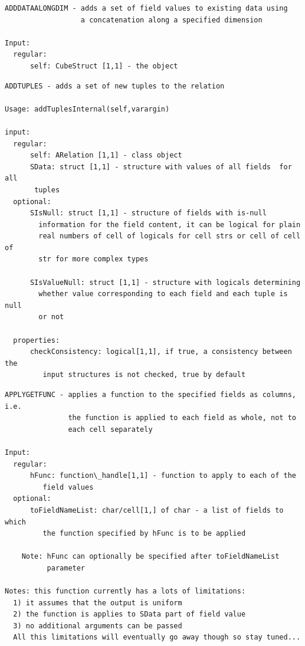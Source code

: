 \documentclass[letterpaper,10pt,english]{sphinxmanual}
\begin{document}
\begin{Verbatim}[commandchars=\\\{\}]
ADDDATAALONGDIM - adds a set of field values to existing data using
                  a concatenation along a specified dimension

Input:
  regular:
      self: CubeStruct [1,1] - the object
\end{Verbatim}

\begin{Verbatim}[commandchars=\\\{\}]
ADDTUPLES - adds a set of new tuples to the relation

Usage: addTuplesInternal(self,varargin)

input:
  regular:
      self: ARelation [1,1] - class object
      SData: struct [1,1] - structure with values of all fields  for all
       tuples
  optional:
      SIsNull: struct [1,1] - structure of fields with is-null
        information for the field content, it can be logical for plain
        real numbers of cell of logicals for cell strs or cell of cell of
        str for more complex types

      SIsValueNull: struct [1,1] - structure with logicals determining
        whether value corresponding to each field and each tuple is null
        or not

  properties:
      checkConsistency: logical[1,1], if true, a consistency between the
         input structures is not checked, true by default
\end{Verbatim}

\begin{Verbatim}[commandchars=\\\{\}]
APPLYGETFUNC - applies a function to the specified fields as columns, i.e.
               the function is applied to each field as whole, not to
               each cell separately

Input:
  regular:
      hFunc: function\_handle[1,1] - function to apply to each of the
         field values
  optional:
      toFieldNameList: char/cell[1,] of char - a list of fields to which
         the function specified by hFunc is to be applied

    Note: hFunc can optionally be specified after toFieldNameList
          parameter

Notes: this function currently has a lots of limitations:
  1) it assumes that the output is uniform
  2) the function is applies to SData part of field value
  3) no additional arguments can be passed
  All this limitations will eventually go away though so stay tuned...
\end{Verbatim}
\end{document}
